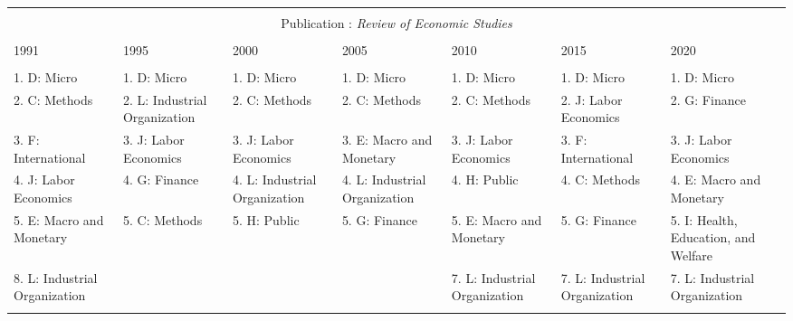 
\begin{table}[h] \centering 
  \caption{} 
  \label{} 
\begin{adjustbox}{max width = \textwidth}
\scriptsize 
\begin{tabular}{@{\extracolsep{5pt}} lllllll} 
\\[-1.8ex]\hline 
\hline \\[-1.8ex] \multicolumn{7}{c}{Publication : \textit{Review of Economic Studies}} \\
 \cline{1-7} \\
1991 & 1995 & 2000 & 2005 & 2010 & 2015 & 2020 \\ 
\hline \\[-1.8ex] 
1. D: Micro & 1. D: Micro & 1. D: Micro & 1. D: Micro & 1. D: Micro & 1. D: Micro & 1. D: Micro \\ 
2. C: Methods & 2. L: Industrial Organization & 2. C: Methods & 2. C: Methods & 2. C: Methods & 2. J: Labor Economics & 2. G: Finance \\ 
3. F: International & 3. J: Labor Economics & 3. J: Labor Economics & 3. E: Macro and Monetary & 3. J: Labor Economics & 3. F: International & 3. J: Labor Economics \\ 
4. J: Labor Economics & 4. G: Finance & 4. L: Industrial Organization & 4. L: Industrial Organization & 4. H: Public & 4. C: Methods & 4. E: Macro and Monetary \\ 
5. E: Macro and Monetary & 5. C: Methods & 5. H: Public & 5. G: Finance & 5. E: Macro and Monetary & 5. G: Finance & 5. I: Health, Education, and Welfare \\ 
8. L: Industrial Organization &  &  &  & 7. L: Industrial Organization & 7. L: Industrial Organization & 7. L: Industrial Organization \\ 
\hline \\[-1.8ex] 
\end{tabular} 
\end{adjustbox} 
\end{table} 
